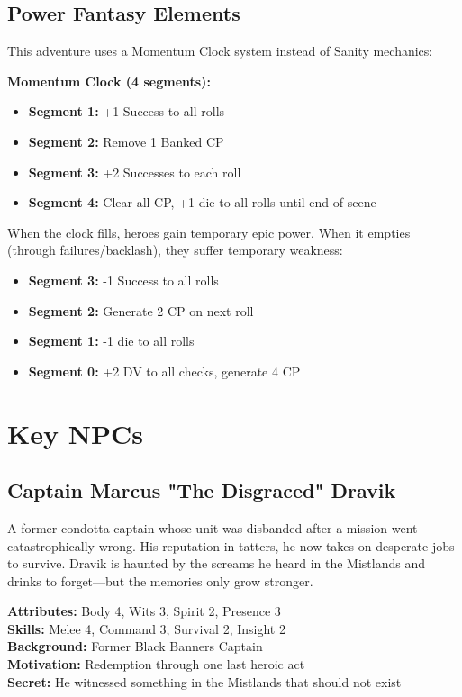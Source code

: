 \documentclass[12pt,twoside]{article}
\begin{document}
\subsection{Power Fantasy Elements}

This adventure uses a Momentum Clock system instead of Sanity mechanics:

\textbf{Momentum Clock (4 segments):}
\begin{itemize}
\item \textbf{Segment 1:} +1 Success to all rolls
\item \textbf{Segment 2:} Remove 1 Banked CP
\item \textbf{Segment 3:} +2 Successes to each roll
\item \textbf{Segment 4:} Clear all CP, +1 die to all rolls until end of scene
\end{itemize}

When the clock fills, heroes gain temporary epic power. When it empties (through failures/backlash), they suffer temporary weakness:
\begin{itemize}
\item \textbf{Segment 3:} -1 Success to all rolls
\item \textbf{Segment 2:} Generate 2 CP on next roll
\item \textbf{Segment 1:} -1 die to all rolls
\item \textbf{Segment 0:} +2 DV to all checks, generate 4 CP
\end{itemize}

\section{Key NPCs}

\subsection{Captain Marcus "The Disgraced" Dravik}

A former condotta captain whose unit was disbanded after a mission went catastrophically wrong. His reputation in tatters, he now takes on desperate jobs to survive. Dravik is haunted by the screams he heard in the Mistlands and drinks to forget—but the memories only grow stronger.

\textbf{Attributes:} Body 4, Wits 3, Spirit 2, Presence 3 \\
\textbf{Skills:} Melee 4, Command 3, Survival 2, Insight 2 \\
\textbf{Background:} Former Black Banners Captain \\
\textbf{Motivation:} Redemption through one last heroic act \\
\textbf{Secret:} He witnessed something in the Mistlands that should not exist
\end{document}
